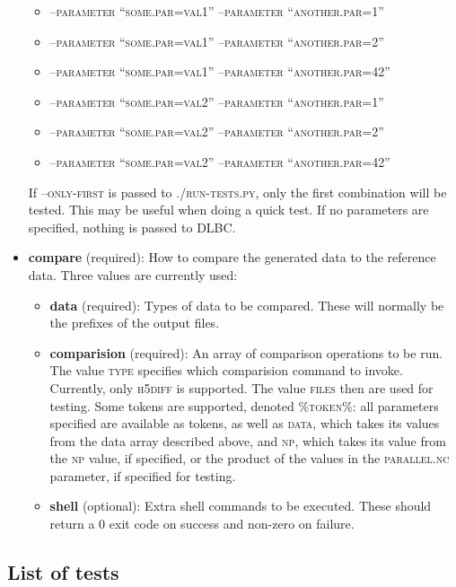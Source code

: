 \documentclass{article}
\begin{document}
\begin{itemize}
\begin{itemize}
\item \textsc{--parameter ``some.par=val1'' --parameter ``another.par=1''}
\item \textsc{--parameter ``some.par=val1'' --parameter ``another.par=2''}
\item \textsc{--parameter ``some.par=val1'' --parameter ``another.par=42''}
\item \textsc{--parameter ``some.par=val2'' --parameter ``another.par=1''}
\item \textsc{--parameter ``some.par=val2'' --parameter ``another.par=2''}
\item \textsc{--parameter ``some.par=val2'' --parameter ``another.par=42''}
\end{itemize}
If \textsc{--only-first} is passed to \textsc{./run-tests.py}, only the first combination will be tested. This may be useful when doing a quick test. If no parameters are specified, nothing is passed to DLBC.
\item \textbf{compare} (required): How to compare the generated data to the reference data. Three values are currently used:
\begin{itemize}
\item \textbf{data} (required): Types of data to be compared. These will normally be the prefixes of the output files.
\item \textbf{comparision} (required): An array of comparison operations to be run. The value \textsc{type} specifies which comparision command to invoke. Currently, only \textsc{h5diff} is supported. The value \textsc{files} then are used for testing. Some tokens are supported, denoted \textsc{\%token\%}: all parameters specified are available as tokens, as well as \textsc{data}, which takes its values from the data array described above, and \textsc{np}, which takes its value from the \textsc{np} value, if specified, or the product of the values in the \textsc{parallel.nc} parameter, if specified for testing.
\item \textbf{shell} (optional): Extra shell commands to be executed. These should return a 0 exit code on success and non-zero on failure.
\end{itemize}
\end{itemize}


\subsection{List of tests}


\end{document}

